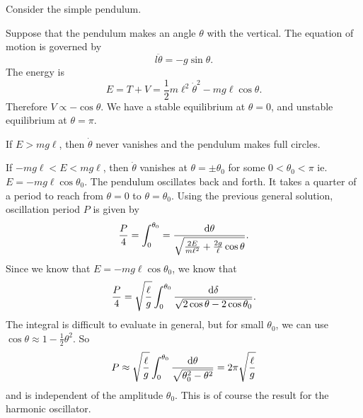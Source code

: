 \documentclass[a4paper]{article}
\begin{document}
\begin{eg}
  Consider the simple pendulum.
  \begin{center}
  \end{center}
  Suppose that the pendulum makes an angle $\theta$ with the vertical. The equation of motion is governed by
  \[
    l\ddot{\theta} = -g\sin \theta.
  \]
  The energy is
  \[
    E = T + V = \frac{1}{2}m\ell^2 \dot{\theta}^2 - mg\ell \cos\theta.
  \]
  Therefore $V\propto -\cos\theta$. We have a stable equilibrium at $\theta = 0 $, and unstable equilibrium at $\theta = \pi$.
  \begin{center}
  \end{center}
  If $E > mg\ell$, then $\dot{\theta}$ never vanishes and the pendulum makes full circles.
  
  If $-mg\ell < E < mg\ell$, then $\dot{\theta}$ vanishes at $\theta = \pm \theta_0$ for some $0 < \theta_0 < \pi$ ie. $E = -mg\ell \cos\theta_0$. The pendulum oscillates back and forth. It takes a quarter of a period to reach from $\theta = 0$ to $\theta = \theta_0$. Using the previous general solution, oscillation period $P$ is given by
  \[
    \frac{P}{4} = \int_0^{\theta_0} = \frac{\mathrm{d} \theta}{\sqrt{\frac{2E}{m\ell^2} + \frac{2g}{\ell }\cos\theta}}.
  \]
  Since we know that $E = -mg\ell \cos \theta_0$, we know that
  \[
    \frac{P}{4} = \sqrt{\frac{\ell}{g}}\int_0^{\theta_0} \frac{\mathrm{d} \delta}{\sqrt{2\cos\theta - 2\cos\theta_0}}.
  \]
  The integral is difficult to evaluate in general, but for small $\theta_0$, we can use $\cos\theta \approx 1 - \frac{1}{2}\theta^2$. So
  \[
    P \approx \sqrt{\frac{\ell}{g}}\int_0^{\theta_0}\frac{\mathrm{d} \theta}{\sqrt{\theta_0^2 - \theta^2}} = 2\pi\sqrt{\frac{\ell}{g}}
  \]
  and is independent of the amplitude $\theta_0$. This is of course the result for the harmonic oscillator. 
\end{eg}
\end{document}
